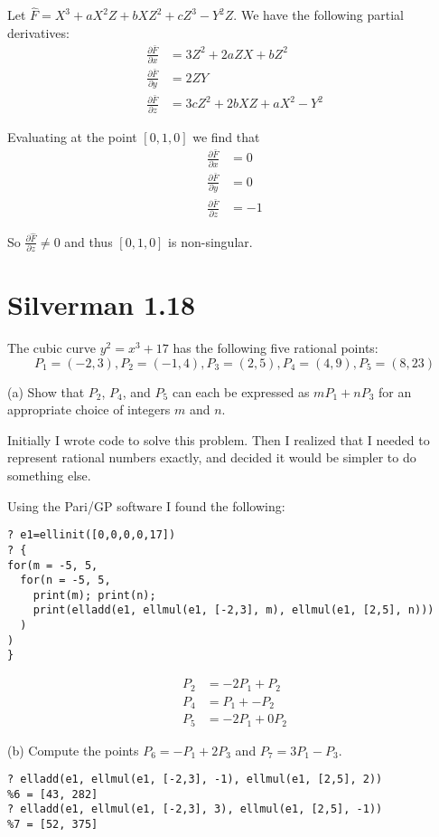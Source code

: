 \documentclass{article}
\begin{document}
Let $\hat F = X^3 + aX^2 Z + bXZ^2 + cZ^3 - Y^2Z$. We have the following partial derivatives:
\begin{align*}
\frac{\partial \bar F}{\partial x} &= 3Z^2 + 2aZX + bZ^2 \\
\frac{\partial \bar F}{\partial y} &= 2ZY \\
\frac{\partial \bar F}{\partial z} &= 3cZ^2 + 2bXZ + aX^2 - Y^2
\end{align*}

Evaluating at the point $[0,1,0]$ we find that
\begin{align*}
\frac{\partial \bar F}{\partial x} &= 0 \\
\frac{\partial \bar F}{\partial y} &= 0 \\
\frac{\partial \bar F}{\partial z} &= -1
\end{align*}

So $\frac{\partial \hat F}{\partial z} \neq 0$ and thus $[0,1,0]$ is non-singular.

\section{Silverman 1.18}
The cubic curve $y^2 = x^3 + 17$ has the following five rational points:
$$P_1 = (-2,3), P_2 = (-1,4), P_3 = (2,5), P_4 = (4,9), P_5 = (8,23)$$

(a) Show that $P_2$, $P_4$, and $P_5$ can each be expressed as $mP_1 + nP_3$ for an appropriate choice of integers $m$ and $n$.

Initially I wrote code to solve this problem. Then I realized that I needed to represent rational numbers exactly, and decided it would be simpler to do something else.

Using the Pari/GP software I found the following:
\begin{verbatim}
? e1=ellinit([0,0,0,0,17])
? {
for(m = -5, 5,
  for(n = -5, 5,
    print(m); print(n);
    print(elladd(e1, ellmul(e1, [-2,3], m), ellmul(e1, [2,5], n)))
  )
)
}
\end{verbatim}

\begin{align*}
P_2 &= -2P_1 + P_2 \\
P_4 &= P_1 + -P_2 \\
P_5 &= -2P_1 + 0P_2
\end{align*}

(b) Compute the points $P_6 = -P_1 + 2P_3$ and $P_7 = 3P_1 - P_3$.
\begin{verbatim}
? elladd(e1, ellmul(e1, [-2,3], -1), ellmul(e1, [2,5], 2))
%6 = [43, 282]
? elladd(e1, ellmul(e1, [-2,3], 3), ellmul(e1, [2,5], -1))
%7 = [52, 375]
\end{verbatim}
\end{document}
